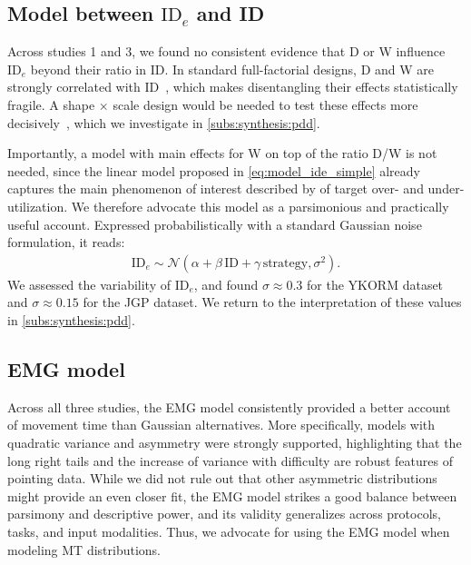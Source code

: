 \documentclass[acmlarge, manuscript,review]{acmart}
\newcommand{\ide}{\ensuremath{{\text{ID}_e}}\xspace}
\begin{document}

\subsection{Model between \ide and ID}
Across studies 1 and 3, we found no consistent evidence that D or W influence \ide beyond their ratio in ID. In standard full-factorial designs, D and W are strongly correlated with ID~\cite{gori2018chi}, which makes disentangling their effects statistically fragile. A shape $\times$ scale design would be needed to test these effects more decisively~\cite{guiard2009}, which we investigate in \autoref{subs:synthesis:pdd}.

Importantly, a model with main effects for W on top of the ratio D/W is not needed, since the linear model proposed in \autoref{eq:model_ide_simple} already captures the main phenomenon of interest described by \citeauthor{zhai2004nominal} of target over- and under-utilization. We therefore advocate this model as a parsimonious and practically useful account. Expressed probabilistically with a standard Gaussian noise formulation, it reads:
\begin{align}
  \ide  \sim \mathcal{N}\left( \alpha + \beta\,\text{ID} + \gamma\,\text{strategy}, \sigma^2 \right).\label{eq:probabilistic_ide}
\end{align}
We assessed the variability of \ide, and found $\sigma \approx 0.3$ for the YKORM dataset and $\sigma \approx 0.15$ for the JGP dataset. We return to the interpretation of these values in \autoref{subs:synthesis:pdd}.

\subsection{EMG model}
Across all three studies, the EMG model consistently provided a better account of movement time than Gaussian alternatives. More specifically, models with quadratic variance and asymmetry were strongly supported, highlighting that the long right tails and the increase of variance with difficulty are robust features of pointing data. While we did not rule out that other asymmetric distributions might provide an even closer fit, the EMG model strikes a good balance between parsimony and descriptive power, and its validity generalizes across protocols, tasks, and input modalities. Thus, we advocate for using the EMG model when modeling MT distributions.
\end{document}
